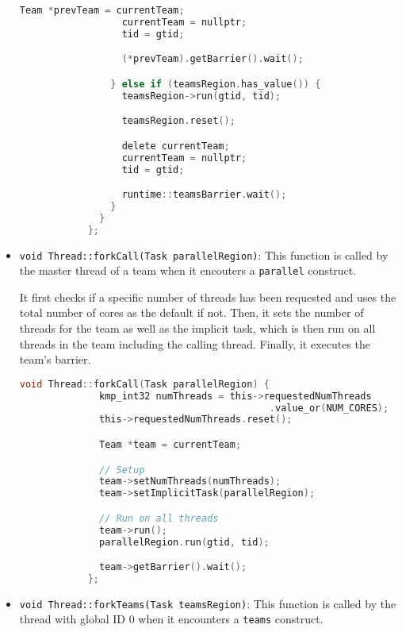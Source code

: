 \begin{itemize}
\begin{lstlisting}[language=C, caption={Thread::run}, label={lst:thread-run},
          escapechar=@]
                  Team *prevTeam = currentTeam;
                  currentTeam = nullptr;
                  tid = gtid;

                  (*prevTeam).getBarrier().wait();

                } else if (teamsRegion.has_value()) {
                  teamsRegion->run(gtid, tid);

                  teamsRegion.reset();

                  delete currentTeam;
                  currentTeam = nullptr;
                  tid = gtid;

                  runtime::teamsBarrier.wait();
                }
              }
            };
          \end{lstlisting}

	\item \texttt{void Thread::forkCall(Task parallelRegion)}: This function is called by the master
	      thread of a team when it encouters a \texttt{parallel} construct.

	      It first checks if a specific number of threads has been requested and uses the total
	      number of cores as the default if not. Then, it sets the number of threads for the team as
	      well as the implicit task, which is then run on all threads in the team including the
	      calling thread. Finally, it executes the team's barrier.

	      \begin{lstlisting}[language=C, caption={Thread::forkCall},
          label={lst:thread-forkCall},
          escapechar=@]
            void Thread::forkCall(Task parallelRegion) {
              kmp_int32 numThreads = this->requestedNumThreads
                                            .value_or(NUM_CORES);
              this->requestedNumThreads.reset();

              Team *team = currentTeam;

              // Setup
              team->setNumThreads(numThreads);
              team->setImplicitTask(parallelRegion);

              // Run on all threads
              team->run();
              parallelRegion.run(gtid, tid);

              team->getBarrier().wait();
            };
    \end{lstlisting}

	\item \texttt{void Thread::forkTeams(Task teamsRegion)}: \label{subsec:thread-forkteams} This
	      function is called by the thread with global ID 0 when it encounters a \texttt{teams}
	      construct.


\end{itemize}
